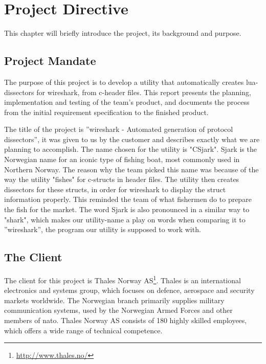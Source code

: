\chapter{Project Directive}
This chapter will briefly introduce the project, its background and purpose.


\section{Project Mandate}
The purpose of this project is to develop a \gls{utility} that automatically creates \Gls{lua}-\glspl{dissector} for \Gls{wireshark}, from \Gls{c}-\gls{header} files. This report presents the planning, implementation
 and testing of the team’s product, and documents the process from the initial requirement specification to the finished product. 

The title of the project is ''\Gls{wireshark} - Automated generation of \gls{protocol} \glspl{dissector}'', it was given to us by the customer and describes exactly what we are planning to accomplish.\cite{Compendium} The name chosen for the \gls{utility} is "CSjark". Sjark is the Norwegian name for an iconic type of fishing boat, most commonly used in Northern Norway. The reason why the team picked this name was because of the way the \gls{utility} "fishes" for \Gls{c}-\glspl{struct} in \gls{header} files. The \gls{utility} then creates \glspl{dissector} for these \glspl{struct}, in order for \Gls{wireshark} to display the \gls{struct} information properly. This reminded the team of what fishermen do to prepare the fish for the market. The word Sjark is also pronounced in a similar way to "shark", which makes our \gls{utility}-name a play on words when comparing it to ''\Gls{wireshark}'', the program our \gls{utility} is supposed to work with.


\section{The Client}
The client for this project is
Thales Norway AS\footnote{\url{http://www.thales.no/}}. Thales is an
international electronics and systems group, which focuses on defence,
aerospace and security markets worldwide. The Norwegian branch primarily
supplies military communication systems, used by the Norwegian Armed Forces
and other members of \Gls{nato}. Thales Norway AS consists of 180 highly skilled
employees, which offers a wide range of technical competence.\cite{ThalesNO}
	
